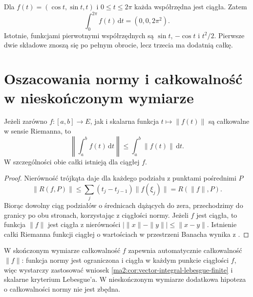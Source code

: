 \begin{przyklad}
\label{ma2:ex:vector-integral-coordinates}
Dla $f(t)=(\cos t,\sin t,t)$ i $0\le t\le2\pi$
każda współrzędna jest ciągła. Zatem
\[
 \int_0^{2\pi} f(t)\,\mathrm dt
 =(0,0,2\pi^2).
\]
Istotnie, funkcjami pierwotnymi współrzędnych
są $\sin t$, $-\cos t$ i $t^2/2$.
Pierwsze dwie składowe znoszą się po pełnym
obrocie, lecz trzecia ma dodatnią całkę.
\end{przyklad}

\section{Oszacowania normy i całkowalność w nieskończonym wymiarze}

\begin{stwierdzenie}
\label{ma2:prop:vector-integral-norm}
Jeżeli zarówno $f:[a,b]\to E$, jak i skalarna
funkcja $t\mapsto\|f(t)\|$ są całkowalne
w sensie Riemanna, to
\[
 \left\|\int_a^b f(t)\,\mathrm dt\right\|
 \le\int_a^b\|f(t)\|\,\mathrm dt.
\]
W szczególności obie całki istnieją dla
ciągłej $f$.
\end{stwierdzenie}
\begin{proof}
Nierówność trójkąta daje dla każdego
podziału z punktami pośrednimi $P$
\[
 \|R(f,P)\|
 \le\sum_j(t_j-t_{j-1})\|f(\xi_j)\|
 =R(\|f\|,P).
\]
Biorąc dowolny ciąg podziałów o średnicach
dążących do zera, przechodzimy do granicy
po obu stronach, korzystając z ciągłości normy.
Jeżeli $f$ jest ciągła, to funkcja $\|f\|$
jest ciągła z nierówności
$|\|x\|-\|y\||\le\|x-y\|$.
Istnienie całki Riemanna funkcji ciągłej
o wartościach w przestrzeni Banacha wynika z
.
\end{proof}

W skończonym wymiarze całkowalność $f$
zapewnia automatycznie całkowalność $\|f\|$:
funkcja normy jest ograniczona i ciągła
w każdym punkcie ciągłości $f$,
więc wystarczy zastosować wniosek
\ref{ma2:cor:vector-integral-lebesgue-finite}
i skalarne kryterium Lebesgue'a.
W nieskończonym wymiarze dodatkowa
hipoteza o całkowalności normy nie jest
zbędna.

